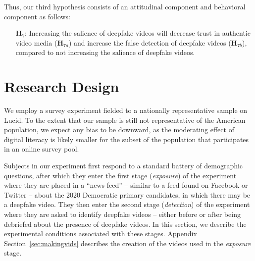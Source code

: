 \documentclass[12pt,letterpaper]{article}
\begin{document}
Thus, our third hypothesis consists of an attitudinal component and behavioral component as follows:

\begin{itemize}
    \item[\textbf{H$_7$}:] Increasing the salience of deepfake videos will decrease trust in authentic video media (\textbf{H$_{7a}$}) and increase the false detection of deepfake videos (\textbf{H$_{7b}$}), compared to not increasing the salience of deepfake videos.
\end{itemize}


\section{Research Design}\label{design}



We employ a survey experiment fielded to a nationally representative sample on Lucid. %
To the extent that our sample is still not representative of the American population, we expect any bias to be downward, as the moderating effect of digital literacy is likely smaller for the subset of the population that participates in an online survey pool.

Subjects in our experiment first respond to a standard battery of demographic questions, after which they enter the first stage (\textit{exposure}) of the experiment where they are placed in a ``news feed'' -- similar to a feed found on Facebook or Twitter -- about the 2020 Democratic primary candidates, in which there may be a deepfake video. They then enter the second stage (\textit{detection}) of the experiment where they are asked to identify deepfake videos -- either before or after being debriefed about the presence of deepfake videos. In this section, we describe the experimental conditions associated with these stages. Appendix Section~\ref{sec:makingvids} describes the creation of the videos used in the \emph{exposure} stage.
\end{document}
